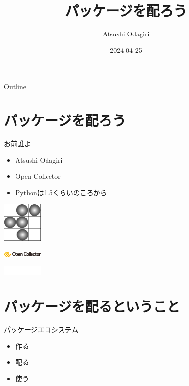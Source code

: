 \documentclass[presentation]{beamer}
\author{Atsushi Odagiri}
\date{2024-04-25}
\title{パッケージを配ろう}
\begin{document}
\maketitle
\begin{frame}{Outline}
\tableofcontents
\end{frame}

\section{パッケージを配ろう}
\label{sec:orge92c719}
\begin{frame}[label={sec:orgb253edf}]{お前誰よ}
\begin{block}{}
\begin{itemize}
\item Atsushi Odagiri
\item Open Collector
\item Pythonは1.5くらいのころから
\end{itemize}
\end{block}

\begin{block}{}
\begin{center}
\includegraphics[width=2cm]{./r-penta512.png}
\end{center}

\begin{center}
\includegraphics[width=2cm]{./oc-logo.png}
\end{center}
\begin{center}
\includegraphics[width=2cm]{./logo-w.png}
\end{center}
\end{block}
\end{frame}
\section{パッケージを配るということ}
\label{sec:orge1f6186}
\begin{frame}[label={sec:org3b6b7ce}]{パッケージエコシステム}
\begin{itemize}
\item 作る
\item 配る
\item 使う
\end{itemize}
\end{frame}
\end{document}
